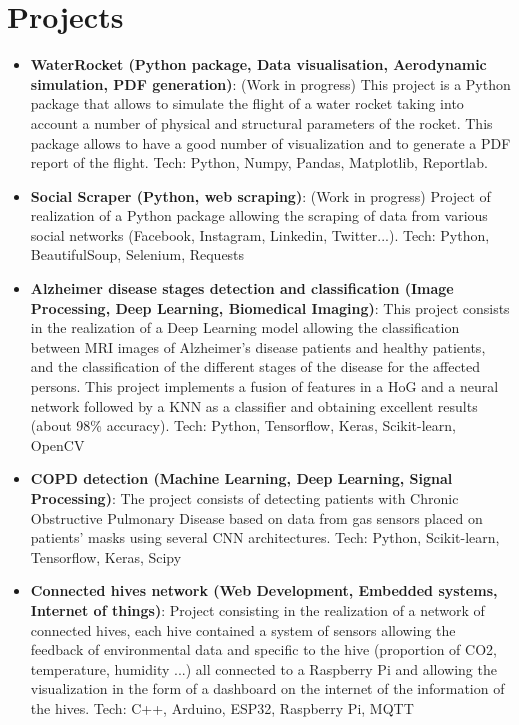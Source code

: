 \documentclass[a4paper,20pt]{article}
\newcommand{\resumeItem}[2]{
  \item\small{
    \textbf{#1}{: #2 \vspace{-2pt}}
  }
}
\newcommand{\resumeSubItem}[2]{\resumeItem{#1}{#2}\vspace{-3pt}}
\newcommand{\resumeSubHeadingListStart}{\begin{itemize}[leftmargin=*]}
\newcommand{\resumeSubHeadingListEnd}{\end{itemize}}
\begin{document}
\section{Projects}
  \resumeSubHeadingListStart
    \resumeSubItem{WaterRocket (Python package, Data visualisation, Aerodynamic simulation, PDF generation)}{(Work in progress) This project is a Python package that allows to simulate the flight of a water rocket taking into account a number of physical and structural parameters of the rocket. This package allows to have a good number of visualization and to generate a PDF report of the flight. Tech: Python, Numpy, Pandas, Matplotlib, Reportlab.}
    \vspace{2pt}
    \resumeSubItem{Social Scraper (Python, web scraping)}{(Work in progress) Project of realization of a Python package allowing the scraping of data from various social networks (Facebook, Instagram, Linkedin, Twitter...). Tech: Python, BeautifulSoup, Selenium, Requests}
    \vspace{2pt}
    \resumeSubItem{Alzheimer disease stages detection and classification (Image Processing, Deep Learning, Biomedical Imaging)}{This project consists in the realization of a Deep Learning model allowing the classification between MRI images of Alzheimer's disease patients and healthy patients, and the classification of the different stages of the disease for the affected persons. This project implements a fusion of features in a HoG and a neural network followed by a KNN as a classifier and obtaining excellent results (about 98\% accuracy). Tech: Python, Tensorflow, Keras, Scikit-learn, OpenCV}
    \vspace{2pt}
    \resumeSubItem{COPD detection (Machine Learning, Deep Learning, Signal Processing)}{The project consists of detecting patients with Chronic Obstructive Pulmonary Disease based on data from gas sensors placed on patients' masks using several CNN architectures. Tech: Python, Scikit-learn, Tensorflow, Keras, Scipy}
    \vspace{2pt}
    \resumeSubItem{Connected hives network (Web Development, Embedded systems, Internet of things)}{Project consisting in the realization of a network of connected hives, each hive contained a system of sensors allowing the feedback of environmental data and specific to the hive (proportion of CO2, temperature, humidity ...) all connected to a Raspberry Pi and allowing the visualization in the form of a dashboard on the internet of the information of the hives. Tech: C++, Arduino, ESP32, Raspberry Pi, MQTT}
  \resumeSubHeadingListEnd
\end{document}
